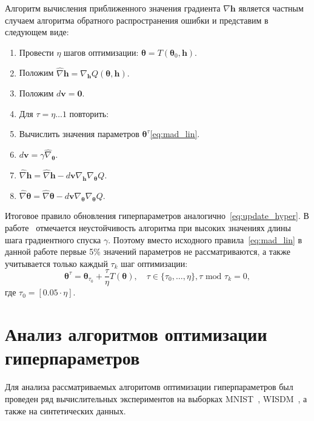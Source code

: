 Алгоритм вычисления приближенного значения градиента $\nabla \mathbf{h}$ является частным случаем алгоритма обратного распространения ошибки и представим в следующем виде:
\begin{enumerate}
\item Провести $\eta$ шагов оптимизации: $\boldsymbol{\theta} = T(\boldsymbol{\theta}_0, \mathbf{h})$.
\item Положим $\hat{\nabla} \mathbf{h} = \nabla_\mathbf{h} Q(\boldsymbol{\theta}, \mathbf{h}).$ 
\item Положим $d\mathbf{v} = \mathbf{0}.$
\item Для $\tau = \eta \dots 1 $ повторить:
\item Вычислить значения параметров $\boldsymbol{\theta}^\tau$\eqref{eq:mad_lin}.
\item $d\mathbf{v} =  \gamma \hat{\nabla}_{\boldsymbol{\theta}}$.
\item $\hat{\nabla} \mathbf{h} =  \hat{\nabla} \mathbf{h} - d\mathbf{v}\nabla_{\mathbf{h}} \nabla_{\boldsymbol{\theta}} Q$.
\item $\hat{\nabla} \boldsymbol{\theta}  = \hat{\nabla} \boldsymbol{\theta}  - d\mathbf{v}\nabla_{\boldsymbol{\theta}} \nabla_{\boldsymbol{\theta}} Q$.
\end{enumerate}

Итоговое правило обновления гиперпараметров аналогично~\eqref{eq:update_hyper}.
В работе~\cite{hyper_mad} отмечается неустойчивость алгоритма при высоких значениях длины шага градиентного спуска $\gamma$. Поэтому вместо исходного правила~\eqref{eq:mad_lin} в данной работе первые 5\% значений параметров не рассматриваются, а также учитывается только каждый $\tau_k$ шаг оптимизации:
\begin{equation}
\label{eq:mad_lin2}
\boldsymbol{\theta}^\tau = \boldsymbol{\theta}_{\tau_0} + \frac{\tau}{\eta} T(\boldsymbol{\theta}), \quad \tau \in \{\tau_0,\dots,\eta\}, \tau \text{ mod } \tau_k = 0,
\end{equation}
где $\tau_0 = [0.05 \cdot \eta]$.


\section{Анализ алгоритмов оптимизации гиперпараметров}
Для анализа рассматриваемых алгоритомв оптимизации гиперпараметров был проведен ряд вычислительных экспериментов на выборках MNIST~\cite{mnist}, WISDM~\cite{wisdm}, а также на синтетических данных.

